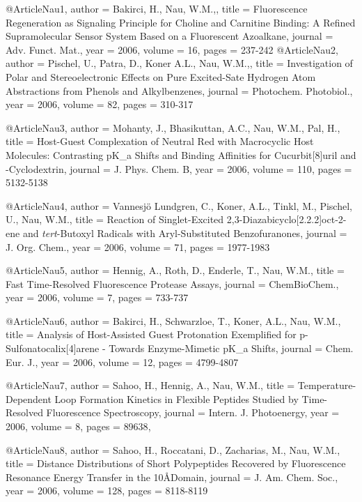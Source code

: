 @Article{Nau1,
  author =   {Bakirci, H., Nau, W.M.,},
  title =    {Fluorescence Regeneration as Signaling Principle for Choline and Carnitine Binding:
  A Refined Supramolecular Sensor System Based on a Fluorescent Azoalkane},
  journal =      {Adv. Funct. Mat.},
  year =     {2006},
  volume =    {16},
  pages =     {237-242}
}
@Article{Nau2,
  author =   {Pischel, U., Patra, D., Koner A.L., Nau, W.M.,},
  title =    {Investigation of Polar and Stereoelectronic Effects on Pure Excited-Sate Hydrogen
  Atom Abstractions from Phenols and Alkylbenzenes},
  journal =      {Photochem. Photobiol.},
  year =     {2006},
  volume =    {82},
  pages =     {310-317}
}

@Article{Nau3,
  author =   {Mohanty, J., Bhasikuttan, A.C., Nau, W.M., Pal, H.},
  title =    {Host-Guest Complexation of Neutral Red with Macrocyclic Host Molecules:
  Contrasting pK_a Shifts and Binding Affinities for Cucurbit[8]uril and \beta-Cyclodextrin},
  journal =      {J. Phys. Chem. B},
  year =     {2006},
  volume =    {110},
  pages =     {5132-5138}
}

@Article{Nau4,
  author =   {Vannesj\"{o} Lundgren, C., Koner, A.L., Tinkl, M., Pischel, U., Nau, W.M.},
  title =    {Reaction of Singlet-Excited 2,3-Diazabicyclo[2.2.2]oct-2-ene and \emph{tert}-Butoxyl
  Radicals with Aryl-Substituted Benzofuranones},
  journal =      {J. Org. Chem.},
  year =     {2006},
  volume =    {71},
  pages =     {1977-1983}
}

@Article{Nau5,
  author =   {Hennig, A., Roth, D., Enderle, T., Nau, W.M.},
  title =    {Fast Time-Resolved Fluorescence Protease Assays},
  journal =      {ChemBioChem.},
  year =     {2006},
  volume =    {7},
  pages =     {733-737}
}

@Article{Nau6,
  author =   {Bakirci, H., Schwarzloe, T., Koner, A.L., Nau, W.M.},
  title =    {Analysis of Host-Assisted Guest Protonation Exemplified for
  p-Sulfonatocalix[4]arene - Towards Enzyme-Mimetic pK_a Shifts},
  journal =      {Chem. Eur. J.},
  year =     {2006},
  volume =    {12},
  pages =     {4799-4807}
}

@Article{Nau7,
  author =   {Sahoo, H., Hennig, A., Nau, W.M.},
  title =    {Temperature-Dependent Loop Formation Kinetics in Flexible
  Peptides Studied by Time-Resolved Fluorescence Spectroscopy},
  journal =      {Intern. J. Photoenergy},
  year =     {2006},
  volume =    {8},
  pages =     {89638},
}

@Article{Nau8,
  author =   {Sahoo, H., Roccatani, D., Zacharias, M., Nau, W.M.},
  title =    {Distance Distributions of Short Polypeptides Recovered
  by Fluorescence Resonance Energy Transfer in the 10\AA Domain},
  journal =      {J. Am. Chem. Soc.},
  year =     {2006},
  volume =    {128},
  pages =     {8118-8119}
}

